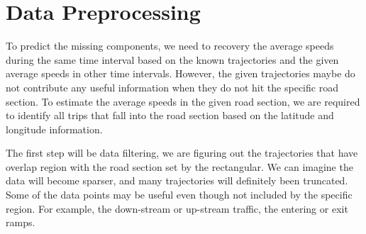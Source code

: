 \documentclass[12pt]{article}
\numberwithin{table}{section}
\begin{document}
\section*{Data Preprocessing}
To predict the missing components, we need to recovery the average speeds during the same time interval based on the known trajectories and the given average speeds in other time intervals. However, the given trajectories maybe do not contribute any useful information when they do not hit the specific road section. To estimate the average speeds in the given road section, we are required to identify all trips that fall into the road section based on the latitude and longitude information. 

The first step will be data filtering, we are figuring out the trajectories that have overlap region with the road section set by the rectangular. We can imagine the data will become sparser, and many trajectories will definitely been truncated. Some of the data points may be useful even though not included by the specific region. For example, the down-stream or up-stream traffic, the entering or exit ramps.



\end{document}
